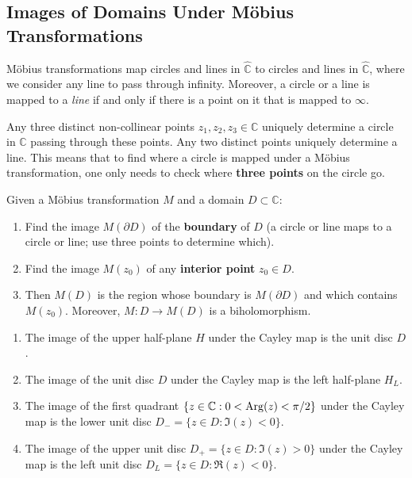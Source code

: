 \documentclass[11pt, a4paper]{article}
\begin{document}
\subsection*{Images of Domains Under M\"obius Transformations}

\begin{thmbox}
M\"obius transformations map circles and lines in $\hat{\mathbb{C}}$ to circles and lines in $\hat{\mathbb{C}}$, where we consider any line to pass through infinity. Moreover, a circle or a line is mapped to a \emph{line} if and only if there is a point on it that is mapped to $\infty$.
\end{thmbox}

\begin{warnbox}[Remark 4.18]
Any three distinct non-collinear points $z_1,z_2,z_3\in\mathbb{C}$ uniquely determine a circle in $\mathbb{C}$ passing through these points. Any two distinct points uniquely determine a line. This means that to find where a circle is mapped under a M\"obius transformation, one only needs to check where \textbf{three points} on the circle go.
\end{warnbox}

\begin{methodbox}
Given a M\"obius transformation $M$ and a domain $D\subset\mathbb{C}$:
\begin{enumerate}
  \item Find the image $M(\partial D)$ of the \textbf{boundary} of $D$ (a circle or line maps to a circle or line; use three points to determine which).
  \item Find the image $M(z_0)$ of any \textbf{interior point} $z_0\in D$.
  \item Then $M(D)$ is the region whose boundary is $M(\partial D)$ and which contains $M(z_0)$. Moreover, $M:D\to M(D)$ is a biholomorphism.
\end{enumerate}
\end{methodbox}

\begin{thmbox}[Lemma 4.19 --- The Cayley Map $M_c(z)=\frac{z-i}{z+i}$]
\begin{enumerate}
  \item The image of the upper half-plane $H$ under the Cayley map is the unit disc $D$.
  \item The image of the unit disc $D$ under the Cayley map is the left half-plane $H_L$.
  \item The image of the first quadrant $\{z\in\mathbb{C}:0<\operatorname{Arg}(z)<\pi/2\}$ under the Cayley map is the lower unit disc $D_-=\{z\in D:\Im(z)<0\}$.
  \item The image of the upper unit disc $D_+=\{z\in D:\Im(z)>0\}$ under the Cayley map is the left unit disc $D_L=\{z\in D:\Re(z)<0\}$.
\end{enumerate}
\end{thmbox}
\end{document}
